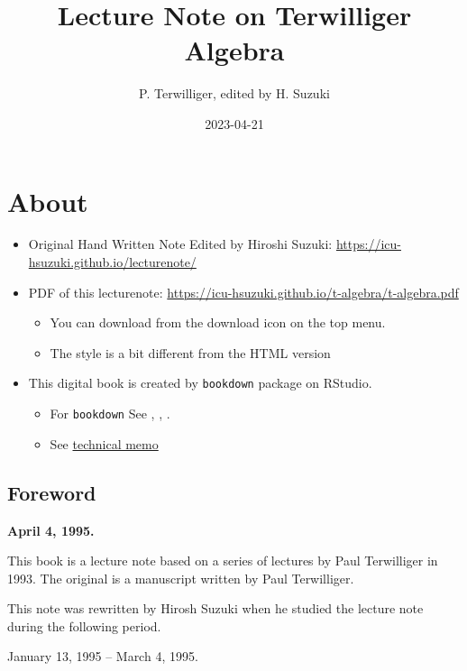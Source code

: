 \documentclass[
]{book}
\title{Lecture Note on Terwilliger Algebra}
\author{P. Terwilliger, edited by H. Suzuki}
\date{2023-04-21}
\providecommand{\tightlist}{%
  \setlength{\itemsep}{0pt}\setlength{\parskip}{0pt}}
\theoremstyle{definition}
\theoremstyle{definition}
\theoremstyle{definition}
\theoremstyle{definition}
\theoremstyle{remark}
\begin{document}
\maketitle

{
\setcounter{tocdepth}{1}
\tableofcontents
}
\hypertarget{about}{%
\chapter*{About}\label{about}}

\begin{itemize}
\tightlist
\item
  Original Hand Written Note Edited by Hiroshi Suzuki: \url{https://icu-hsuzuki.github.io/lecturenote/}
\item
  PDF of this lecturenote: \url{https://icu-hsuzuki.github.io/t-algebra/t-algebra.pdf}

  \begin{itemize}
  \tightlist
  \item
    You can download from the download icon on the top menu.
  \item
    The style is a bit different from the HTML version
  \end{itemize}
\item
  This digital book is created by \texttt{bookdown} package on RStudio.

  \begin{itemize}
  \tightlist
  \item
    For \texttt{bookdown} See \citep{xie2015}, \citep{xie2017}, \citep{xie2018}.
  \item
    See \protect\hyperlink{memo}{technical memo}
  \end{itemize}
\end{itemize}

\hypertarget{foreword}{%
\section*{Foreword}\label{foreword}}

\textbf{April 4, 1995.}

This book is a lecture note based on a series of lectures by Paul Terwilliger in 1993. The original is a manuscript written by Paul Terwilliger.

This note was rewritten by Hirosh Suzuki when he studied the lecture note during the following period.

January 13, 1995 -- March 4, 1995.
\end{document}
